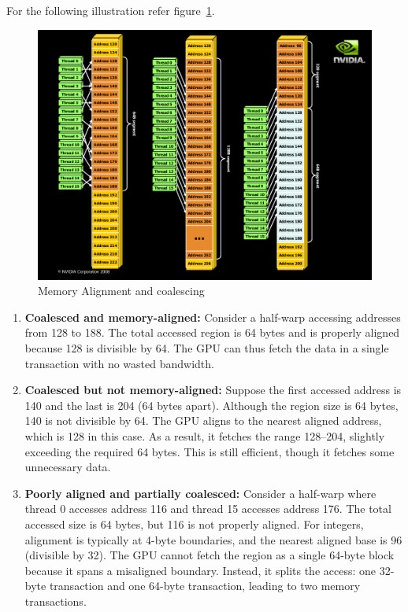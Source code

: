 \documentclass[12pt]{book}
\begin{document}
For the following illustration refer figure~\ref{fig:mem_algn}.
\begin{figure}
    \centering
    \includegraphics[width=0.75\linewidth]{images/cuda_optiz.png}
    \caption{Memory Alignment and coalescing}
    \label{fig:mem_algn}
\end{figure}
\begin{enumerate}
    \item \textbf{Coalesced and memory-aligned:}  
    Consider a half-warp accessing addresses from 128 to 188. The total accessed region is 64 bytes and is properly aligned because 128 is divisible by 64. The GPU can thus fetch the data in a single transaction with no wasted bandwidth.

    \item \textbf{Coalesced but not memory-aligned:}  
    Suppose the first accessed address is 140 and the last is 204 (64 bytes apart). Although the region size is 64 bytes, 140 is not divisible by 64. The GPU aligns to the nearest aligned address, which is 128 in this case. As a result, it fetches the range 128–204, slightly exceeding the required 64 bytes. This is still efficient, though it fetches some unnecessary data.

    \item \textbf{Poorly aligned and partially coalesced:}  
    Consider a half-warp where thread 0 accesses address 116 and thread 15 accesses address 176. The total accessed size is 64 bytes, but 116 is not properly aligned. For integers, alignment is typically at 4-byte boundaries, and the nearest aligned base is 96 (divisible by 32).  
    The GPU cannot fetch the region as a single 64-byte block because it spans a misaligned boundary. Instead, it splits the access: one 32-byte transaction and one 64-byte transaction, leading to two memory transactions.
\end{enumerate}
\end{document}
